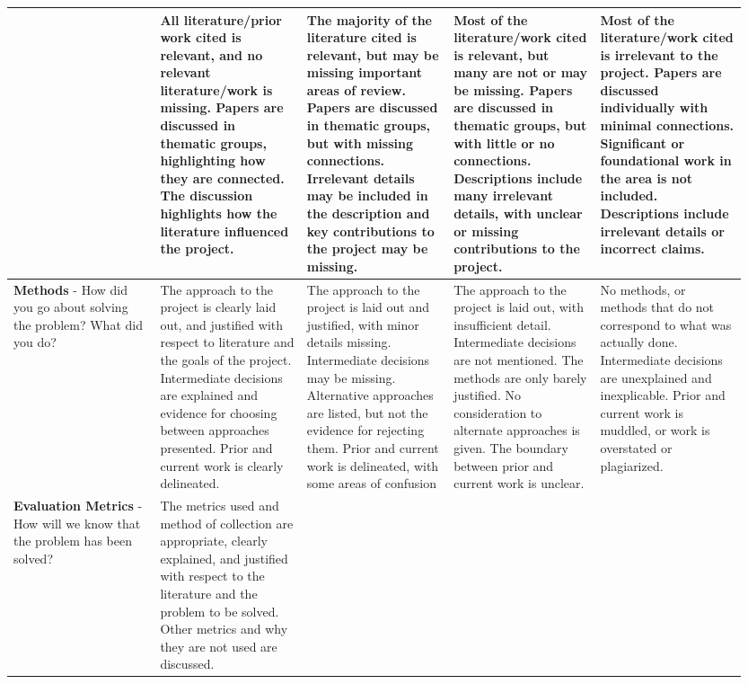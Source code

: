 \documentclass[10pt,twocolumn]{article}
\begin{document}
\begin{landscape}
\begin{longtable}{p{0.19\linewidth} | p{0.19\linewidth} | p{0.19\linewidth} | p{0.19\linewidth} | p{0.19\linewidth}}
    & \cellcolor{excellent} All literature/prior work cited is relevant, and no relevant literature/work is missing. Papers are discussed in thematic groups, highlighting how they are connected. The discussion highlights how the literature influenced the project.
    & \cellcolor{good} The majority of the literature cited is relevant, but may be missing important areas of review. Papers are discussed in thematic groups, but with missing connections. Irrelevant details may be included in the description and key contributions to the project may be missing.
    & \cellcolor{marginal} Most of the literature/work cited is relevant, but many are not or may be missing. Papers are discussed in thematic groups, but with little or no connections. Descriptions include many irrelevant details, with unclear or missing contributions to the project.
    & \cellcolor{unacceptable} Most of the literature/work cited is irrelevant to the project. Papers are discussed individually with minimal connections. Significant or foundational work in the area is not included. Descriptions include irrelevant details or incorrect claims. \\
\midrule
\textbf{Methods} - How did you go about solving the problem? What did you do?
    & \cellcolor{excellent} The approach to the project is clearly laid out, and justified with respect to literature and the goals of the project. Intermediate decisions are explained and evidence for choosing between approaches presented. Prior and current work is clearly delineated.
    & \cellcolor{good} The approach to the project is laid out and justified, with minor details missing. Intermediate decisions may be missing. Alternative approaches are listed, but not the evidence for rejecting them. Prior and current work is delineated, with some areas of confusion
    & \cellcolor{marginal} The approach to the project is laid out, with insufficient detail. Intermediate decisions are not mentioned. The methods are only barely justified. No consideration to alternate approaches is given. The boundary between prior and current work is unclear.
    & \cellcolor{unacceptable} No methods, or methods that do not correspond to what was actually done. Intermediate decisions are unexplained and inexplicable. Prior and current work is muddled, or work is overstated or plagiarized. \\
\midrule
\textbf{Evaluation Metrics} - How will we know that the problem has been solved?
    & \cellcolor{excellent} The metrics used and method of collection are appropriate, clearly explained, and justified with respect to the literature and the problem to be solved. Other metrics and why they are not used are discussed.

\end{longtable}
\end{landscape}
\end{document}
